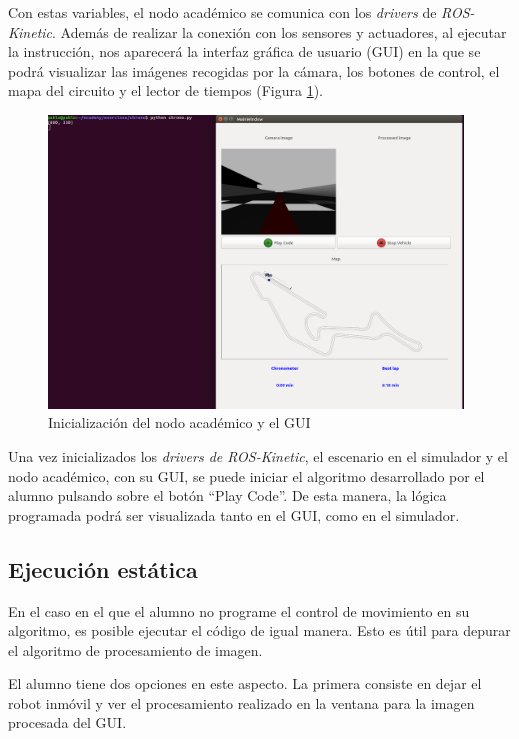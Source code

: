 Con estas variables, el nodo académico se comunica con los \textit{drivers} de \textit{ROS-Kinetic}.
Además de realizar la conexión con los sensores y actuadores, al ejecutar la instrucción, nos aparecerá la interfaz gráfica de usuario (GUI) en la que se podrá visualizar las imágenes recogidas por la cámara, los botones de control, el mapa del circuito y el lector de tiempos (Figura \ref{fig.inaGch}).

\begin{figure}[H]
  \begin{center}
    \includegraphics[width=0.98\textwidth]{figures/init_na_chrono.png}
		\caption{Inicialización del nodo académico y el GUI}
		\label{fig.inaGch}
		\end{center}
\end{figure}

Una vez inicializados los \textit{drivers de ROS-Kinetic}, el escenario en el simulador y el nodo académico, con su GUI, se puede iniciar el algoritmo desarrollado por el alumno pulsando sobre el botón ``Play Code''. De esta manera, la lógica programada podrá ser visualizada tanto en el GUI, como en el simulador.
 
\subsection{Ejecución estática}
En el caso en el que el alumno no programe el control de movimiento en su algoritmo, es posible ejecutar el código de igual manera. Esto es útil para depurar el algoritmo de procesamiento de imagen. 

El alumno tiene dos opciones en este aspecto. La primera consiste en dejar el robot inmóvil y ver el procesamiento realizado en la ventana para la imagen procesada del GUI. 

